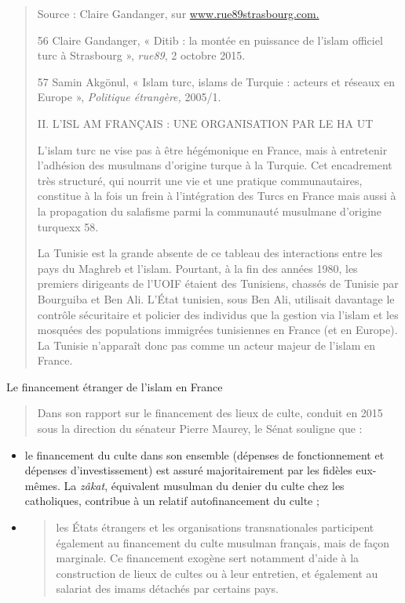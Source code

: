 \begin{quote}
Source : Claire Gandanger, sur
\href{http://www.rue89strasbourg.com/}{www.rue89strasbourg.com.}

56 Claire Gandanger, « Ditib : la montée en puissance de l'islam
officiel turc à Strasbourg », \emph{rue89}, 2 octobre 2015.

57 Samin Akgönul, « Islam turc, islams de Turquie : acteurs et réseaux
en Europe », \emph{Politique étrangère,} 2005/1.

II. L'ISL AM FRANÇAIS : UNE ORGANISATION PAR LE HA UT

L'islam turc ne vise pas à être hégémonique en France, mais à entretenir
l'adhésion des musulmans d'origine turque à la Turquie. Cet encadrement
très structuré, qui nourrit une vie et une pratique communautaires,
constitue à la fois un frein à l'intégration des Turcs en France mais
aussi à la propagation du salafisme parmi la communauté musulmane
d'origine turquexx 58.

La Tunisie est la grande absente de ce tableau des interactions entre
les pays du Maghreb et l'islam. Pourtant, à la fin des années 1980, les
premiers dirigeants de l'UOIF étaient des Tunisiens, chassés de Tunisie
par Bourguiba et Ben Ali. L'État tunisien, sous Ben Ali, utilisait
davantage le contrôle sécuritaire et policier des individus que la
gestion via l'islam et les mosquées des populations immigrées
tunisiennes en France (et en Europe). La Tunisie n'apparaît donc pas
comme un acteur majeur de l'islam en France.
\end{quote}

Le financement étranger de l'islam en France

\begin{quote}
Dans son rapport sur le financement des lieux de culte, conduit en 2015
sous la direction du sénateur Pierre Maurey, le Sénat souligne que :
\end{quote}

\begin{itemize}
\item
  le financement du culte dans son ensemble (dépenses de fonctionnement
  et dépenses d'investissement) est assuré majoritairement par les
  fidèles eux- mêmes. La \emph{zâkat}, équivalent musulman du denier du
  culte chez les catholiques, contribue à un relatif autofinancement du
  culte ;
\item
  \begin{quote}
  les États étrangers et les organisations transnationales participent
  également au financement du culte musulman français, mais de façon
  marginale. Ce financement exogène sert notamment d'aide à la
  construction de lieux de cultes ou à leur entretien, et également au
  salariat des imams détachés par certains pays.
  \end{quote}
\end{itemize}

